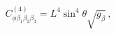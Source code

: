 \begin{equation}
C^{(4)}_{\phi\beta_1\beta_2\beta_3}=L^4\sin^4{\theta}\sqrt{g_\beta}\, ,
\end{equation}

